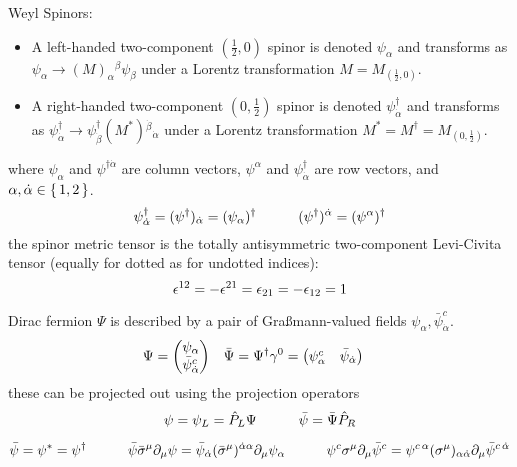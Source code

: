 			\noindent
			Weyl Spinors:
			\begin{itemize}
				\item A left-handed two-component $(\frac{1}{2},0)$ spinor is denoted $\psi_{\alpha}$ and transforms as $\psi_{\alpha} \to (M)_{\alpha}{}^{\beta} \psi_{\beta}$ under a Lorentz transformation $M=M_{(\frac{1}{2},0)}$.
				\item A right-handed two-component $(0,\frac{1}{2})$ spinor is denoted $\psi_{\dot{\alpha}}^\dagger$ and transforms as $\psi_{\dot{\alpha}}^\dagger \to \psi_{\dot{\beta}}^\dagger (M^{*}){}^{\dot{\beta}}{}_{\dot{\alpha}}$ under a Lorentz transformation $M^{*}=M^\dagger =M_{(0,\frac{1}{2})}$.
			\end{itemize}
			where $\psi_\alpha$ and $\psi^{\dagger\dot{\alpha}}$ are column vectors, $\psi^\alpha$ and $\psi^\dagger_{\dot{\alpha}}$ are row vectors, and $\alpha,\dot{\alpha}\in\set{1,2}$.
			\begin{equation}
				\psi^\dagger_{\dot{\alpha}} = (\psi^\dagger)_{\dot{\alpha}} = (\psi_\alpha)^\dagger
				\hspace{30pt}
				(\psi^\dagger)^{\dot{\alpha}} = (\psi^\alpha)^\dagger
			\end{equation}
			the spinor metric tensor is the totally antisymmetric two-component Levi-Civita tensor (equally for dotted as for undotted indices):
			\begin{equation}
				\epsilon^{12} = - \epsilon^{21} = \epsilon_{21} = - \epsilon_{12} = 1
			\end{equation}

			\noindent
			Dirac fermion $\Psi$ is described by a pair of Graßmann-valued fields $\psi_{\alpha}, \bar{\psi}^c_{\dot{\alpha}}$.
			\begin{align}
				\Psi &= \mqty(\psi_{\alpha} \\ \bar{\psi}^c_{\dot{\alpha}})
				& \bar{\Psi} &= \Psi^\dagger\gamma^0 = \mqty(\psi^c_{\alpha} & \bar{\psi}_{\dot{\alpha}})
			\end{align}
			these can be projected out using the projection operators
			\begin{equation}
				\psi = \psi_L = \hat{P}_L \Psi
				\hspace{30pt} \bar{\psi} = \bar{\Psi} \hat{P}_R
			\end{equation}

			\begin{equation}
				\bar{\psi} = \psi^{*} = \psi^\dagger
				\hspace{30pt} \bar{\psi} \bar{\sigma}^\mu \partial_\mu \psi = \bar{\psi}_{\dot{\alpha}} (\bar{\sigma}^\mu)^{\dot{\alpha}\alpha}\partial_\mu \psi_{\alpha}
				\hspace{30pt} \psi^c \sigma^\mu \partial_\mu \bar{\psi}^c = \psi^{c\,\alpha} (\sigma^\mu)_{\alpha\dot{\alpha}}\partial_\mu \bar{\psi}^{c\,\dot{\alpha}}
			\end{equation}




